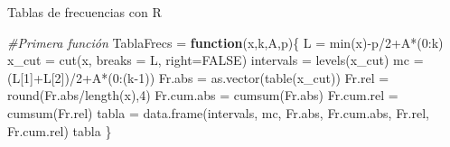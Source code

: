 \documentclass[
  ignorenonframetext,
  aspectratio=169]{beamer}
\newenvironment{Shaded}{\begin{snugshade}}{\end{snugshade}}
\newcommand{\AttributeTok}[1]{\textcolor[rgb]{0.77,0.63,0.00}{#1}}
\newcommand{\CommentTok}[1]{\textcolor[rgb]{0.56,0.35,0.01}{\textit{#1}}}
\newcommand{\ConstantTok}[1]{\textcolor[rgb]{0.00,0.00,0.00}{#1}}
\newcommand{\ControlFlowTok}[1]{\textcolor[rgb]{0.13,0.29,0.53}{\textbf{#1}}}
\newcommand{\DecValTok}[1]{\textcolor[rgb]{0.00,0.00,0.81}{#1}}
\newcommand{\FunctionTok}[1]{\textcolor[rgb]{0.00,0.00,0.00}{#1}}
\newcommand{\NormalTok}[1]{#1}
\newcommand{\OtherTok}[1]{\textcolor[rgb]{0.56,0.35,0.01}{#1}}
\newcommand{\SpecialCharTok}[1]{\textcolor[rgb]{0.00,0.00,0.00}{#1}}
\begin{document}
\begin{frame}[fragile]{Tablas de frecuencias con R}
\protect\hypertarget{tablas-de-frecuencias-con-r}{}
\begin{Shaded}
\begin{Highlighting}[]
\CommentTok{\#Primera función}
\NormalTok{TablaFrecs }\OtherTok{=} \ControlFlowTok{function}\NormalTok{(x,k,A,p)\{ }
\NormalTok{  L }\OtherTok{=} \FunctionTok{min}\NormalTok{(x)}\SpecialCharTok{{-}}\NormalTok{p}\SpecialCharTok{/}\DecValTok{2}\SpecialCharTok{+}\NormalTok{A}\SpecialCharTok{*}\NormalTok{(}\DecValTok{0}\SpecialCharTok{:}\NormalTok{k)}
\NormalTok{  x\_cut }\OtherTok{=} \FunctionTok{cut}\NormalTok{(x, }\AttributeTok{breaks =}\NormalTok{ L, }\AttributeTok{right=}\ConstantTok{FALSE}\NormalTok{)}
\NormalTok{  intervals }\OtherTok{=} \FunctionTok{levels}\NormalTok{(x\_cut)}
\NormalTok{  mc }\OtherTok{=}\NormalTok{ (L[}\DecValTok{1}\NormalTok{]}\SpecialCharTok{+}\NormalTok{L[}\DecValTok{2}\NormalTok{])}\SpecialCharTok{/}\DecValTok{2}\SpecialCharTok{+}\NormalTok{A}\SpecialCharTok{*}\NormalTok{(}\DecValTok{0}\SpecialCharTok{:}\NormalTok{(k}\DecValTok{{-}1}\NormalTok{))}
\NormalTok{  Fr.abs }\OtherTok{=} \FunctionTok{as.vector}\NormalTok{(}\FunctionTok{table}\NormalTok{(x\_cut)) }
\NormalTok{  Fr.rel }\OtherTok{=} \FunctionTok{round}\NormalTok{(Fr.abs}\SpecialCharTok{/}\FunctionTok{length}\NormalTok{(x),}\DecValTok{4}\NormalTok{) }
\NormalTok{  Fr.cum.abs }\OtherTok{=} \FunctionTok{cumsum}\NormalTok{(Fr.abs) }
\NormalTok{  Fr.cum.rel }\OtherTok{=} \FunctionTok{cumsum}\NormalTok{(Fr.rel)}
\NormalTok{  tabla }\OtherTok{=} \FunctionTok{data.frame}\NormalTok{(intervals, mc, Fr.abs, Fr.cum.abs, Fr.rel, Fr.cum.rel)}
\NormalTok{  tabla}
\NormalTok{  \}}
\end{Highlighting}
\end{Shaded}
\end{frame}
\end{document}
